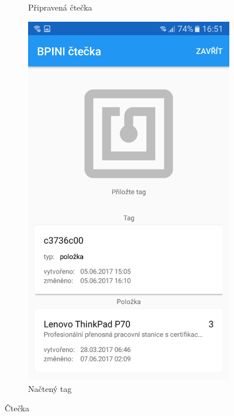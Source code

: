 \documentclass[12pt]{report}
\begin{document}
\begin{figure}[H]
\begin{subfigure}[b]{0.3\textwidth}
	\caption{Připravená čtečka}
	\label{fig:Screenshot_20170607-165058}
  \end{subfigure}
  \begin{subfigure}[b]{0.3\textwidth}
    \centering
	\includegraphics[width=\textwidth]{../images/client_android/Screenshot_20170607-165117.png}	
	\caption{Načtený tag}
	\label{fig:Screenshot_20170607-165117}
  \end{subfigure}
  \caption{Čtečka}
\end{figure}
\end{document}
